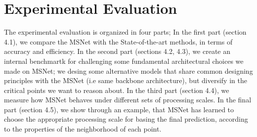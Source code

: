 \documentclass[runningheads]{llncs}
\begin{document}
\begin{table}
    \centering
    \caption{Description of CNN architectures}
    \label{tab:learnable_models}
\end{table}

\section{Experimental Evaluation}

The experimental evaluation is organized in four parts; In the first part (section 4.1), we compare the MSNet with the State-of-the-art methods, in terms of accuracy and efficiency. In the second part (sections 4.2, 4.3), we create an internal benchmartk for challenging some fundamental architectural choices we made on MSNet; we desing some alternative models that share common designing principles with the MSNet (i.e same backbone architecture), but diversify in the critical points we want to reason about. In the third part (section 4.4), we measure how MSNet
behaves under different sets of processing scales. In the final part (section 4.5), we show through an example, that MSNet has learned to choose the appropriate processing scale for basing the final prediction, according to the properties of the neighborhood of each point. 
\end{document}
